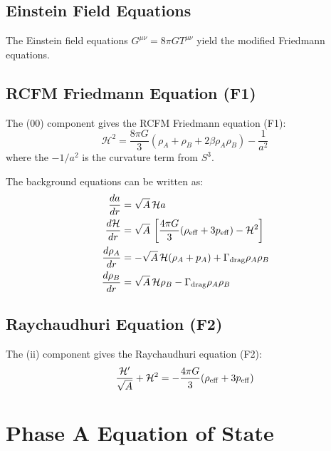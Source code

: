 \documentclass[10pt,twocolumn]{article}
\theoremstyle{definition}
\newcommand{\rhoA}{\rho_{A}}
\newcommand{\rhoB}{\rho_{B}}
\newcommand{\Hcal}{\mathcal{H}}
\newcommand{\Gammadrag}{\Gamma_{\mathrm{drag}}}
\begin{document}
\subsection{Einstein Field Equations}

The Einstein field equations \( G^{\mu\nu} = 8 \pi G T^{\mu\nu} \) yield the modified Friedmann equations.



\subsection{RCFM Friedmann Equation (F1)}

The (00) component gives the RCFM Friedmann equation (F1):
\begin{equation}
  \Hcal^{2} = \frac{8 \pi G}{3} (\rhoA + \rhoB + 2 \beta \rhoA \rhoB) - \frac{1}{a^{2}}
  \label{eq:F1}
\end{equation}
where the \( -1/a^{2} \) is the curvature term from \( S^{3} \).

The background equations can be written as:
\begin{align}
  \frac{da}{dr} &= \sqrt{A}\,\Hcal a \label{eq:bg1} \\
  \frac{d\Hcal}{dr} &= \sqrt{A}\,\left[\frac{4\pi G}{3}(\rho_{\rm eff}+3p_{\rm eff}) - \Hcal^{2}\right] \label{eq:bg2} \\
  \frac{d\rhoA}{dr} &= -\sqrt{A}\,\Hcal(\rhoA + p_{A}) + \Gammadrag\rhoA\rhoB \label{eq:bg3} \\
  \frac{d\rhoB}{dr} &= \sqrt{A}\,\Hcal\rhoB - \Gammadrag\rhoA\rhoB \label{eq:bg4}
\end{align}



\subsection{Raychaudhuri Equation (F2)}

The (ii) component gives the Raychaudhuri equation (F2):
\begin{equation}
  \frac{\Hcal'}{\sqrt{A}} + \Hcal^2 = -\frac{4\pi G}{3}(\rho_{\rm eff} + 3p_{\rm eff})
  \label{eq:F2}
\end{equation}



\section{Phase A Equation of State}
\label{sec:eos}
\end{document}
